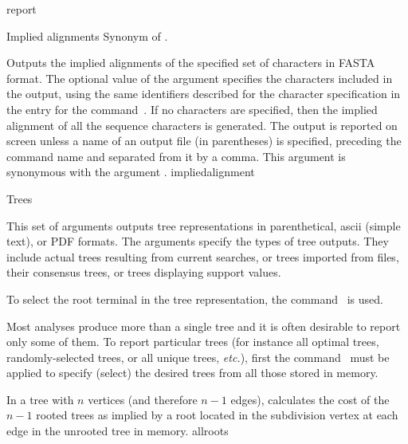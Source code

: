 \begin{command}{report}{}
\begin{arguments}
\begin{argumentgroup}{Implied alignments}
                {Synonym of .}
                {}
            
                {Outputs the implied alignments of the specified
                set of characters in FASTA format. The optional value of the
                argument specifies the characters included
                in the output, using the same identifiers described for the
                character specification in the entry for the command~. If no
                characters are specified, then the implied alignment of all the
                sequence characters is generated. The output is reported on
                screen unless a name of an output file (in parentheses) is
                specified, preceding the command name and separated from it by a
                comma. This argument is synonymous with the argument .}
                {impliedalignment}

        \end{argumentgroup}
    
        \begin{argumentgroup}{Trees}
            {This set of arguments outputs tree representations
            in parenthetical, ascii (simple text), or PDF formats.
            The arguments specify the types of tree outputs. They include
            actual trees resulting from current searches, or trees imported from
            files, their consensus trees, or trees displaying support values.
        
            To select the root terminal in the tree representation, the command~ is used.
        
            Most analyses produce more than a single tree and it is
            often desirable to report only some of them. To
            report particular trees (for instance all optimal trees,
            randomly-selected trees, or all unique trees, \emph{etc.}), first the
            command~ must be applied to specify (select)
            the desired trees from all those stored in memory.} 

                {In a tree with $n$ vertices (and therefore $n - 1$ edges),
                calculates the cost of the $n - 1$ rooted trees as implied by a
                root located in the subdivision vertex at each edge in the unrooted
                tree in memory.}
                {allroots}


\end{argumentgroup}
\end{arguments}
\end{command}
